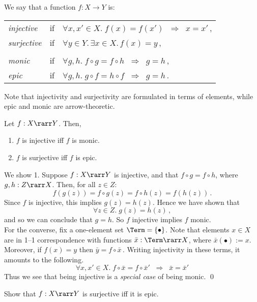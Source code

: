 \documentclass[12pt]{article}
\begin{document}
We say that a function $f : X \longrightarrow Y$ is:
\begin{center}
\begin{tabular}{lll}
\emph{injective} & if &
$\forall x,x'\in X.\;f(x) = f(x') \;\; \Longrightarrow \;\; x = x'$\,, \\
\emph{surjective} & if &
$\forall y \in Y. \, \exists x \in X. \, f(x) = y$\,, \\
\\
\emph{monic} & if &
$\forall g,h.\;f \circ g = f \circ h \;\; \Longrightarrow \;\; g = h$\,, \\
\emph{epic} & if & $\forall g,h.\;g \circ f = h \circ f \;\; \Longrightarrow \;\; g = h$\,.
\end{tabular}
\end{center}
Note that injectivity and surjectivity are formulated in terms of elements, while epic and monic are arrow-theoretic.
\begin{myproposition} Let $f:X\rarr Y$. Then,
\begin{enumerate}\renewcommand{\theenumi}{{\rm\arabic{enumi}}}
\item $f$ is injective iff $f$ is monic.
\item $f$ is surjective iff $f$ is epic.
\end{enumerate}
\end{myproposition}
\proof We show 1. Suppose $f : X \rarr Y$ is injective, and that $f \circ g = f \circ h$, where $g, h : Z \rarr X$. Then, for all $z \in Z$:
\[ f(g(z)) = f \circ g(z) = f \circ h(z) = f(h(z))\,. \]
Since $f$ is injective, this implies $g(z) = h(z)$. Hence we have shown that
\[ \forall z \in Z. \; g(z) = h(z)\,, \]
and so we can conclude that $g = h$. So $f$ injective implies $f$ monic.
\\
For the converse, fix a one-element set $\Term = \{ \bullet \}$. Note that elements $x \in X$ are in 1--1 correspondence with functions $\bar{x} :
\Term \rarr X$, where $\bar{x}(\bullet) := x$. Moreover, if $f(x) = y$ then $\bar{y} = f \circ \bar{x}$\,. Writing injectivity in these terms, it
amounts to the following.
\[ \forall x, x' \in X. \; f \circ \bar{x} = f \circ \bar{x}' \;\; \Longrightarrow \;\; \bar{x} = \bar{x}'  \]
Thus we see that being injective is a \emph{special case} of being monic. \qed
\begin{myexercise}
Show that $f:X\rarr Y$ is surjective iff it is epic.
\end{myexercise}
\end{document}
